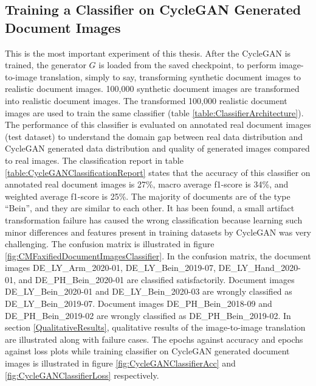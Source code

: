 \subsection{Training a Classifier on \ac{CycleGAN} Generated Document Images}\label{trainingCycleGANDataClassifier}


This is the most important experiment of this thesis. After the \ac{CycleGAN} is trained, the generator $G$ is loaded from the saved checkpoint, to perform image-to-image translation, simply to say, transforming synthetic document images to realistic document images. 100,000 synthetic document images are transformed into realistic document images. The transformed 100,000 realistic document images are used to train the same classifier (table \ref{table:ClassifierArchitecture}). The performance of this classifier is evaluated on annotated real document images (test dataset) to understand the domain gap between real data distribution and \ac{CycleGAN} generated data distribution and quality of generated images compared to real images. The classification report in table \ref{table:CycleGANClassificationReport} states that the accuracy of this classifier on annotated real document images is 27\%, macro average f1-score is 34\%, and weighted average f1-score is 25\%. The majority of documents are of the type ``Bein'', and they are similar to each other. It has been found, a small artifact transformation failure has caused the wrong classification because learning such minor differences and features present in training datasets by \ac{CycleGAN} was very challenging. The confusion matrix is illustrated in figure \ref{fig:CMFaxifiedDocumentImagesClassifier}. In the confusion matrix, the document images DE\_LY\_Arm\_2020-01, DE\_LY\_Bein\_2019-07,  DE\_LY\_Hand\_2020-01, and DE\_PH\_Bein\_2020-01 are classified satisfactorily. Document images DE\_LY\_Bein\_2020-01 and DE\_LY\_Bein\_2020-03 are wrongly classified as DE\_LY\_Bein\_2019-07. Document images DE\_PH\_Bein\_2018-09 and DE\_PH\_Bein\_2019-02 are wrongly classified as DE\_PH\_Bein\_2019-02. In section \ref{QualitativeResults}, qualitative results of the image-to-image translation are illustrated along with failure cases. The epochs against accuracy and epochs against loss plots while training classifier on \ac{CycleGAN} generated document images is illustrated in figure \ref{fig:CycleGANClassifierAcc} and \ref{fig:CycleGANClassifierLoss} respectively.



